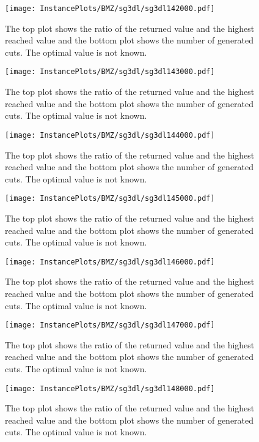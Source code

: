 \documentclass[10pt,a4paper]{article}
\begin{document}
\begin{figure}[H]
\texttt{[image: InstancePlots/BMZ/sg3dl/sg3dl142000.pdf]}
\caption{The top plot shows the ratio of the returned value and the highest reached value     and the bottom plot shows the number of generated cuts. The optimal value is not known.}
\end{figure}

\begin{figure}[H]
\texttt{[image: InstancePlots/BMZ/sg3dl/sg3dl143000.pdf]}
\caption{The top plot shows the ratio of the returned value and the highest reached value     and the bottom plot shows the number of generated cuts. The optimal value is not known.}
\end{figure}

\begin{figure}[H]
\texttt{[image: InstancePlots/BMZ/sg3dl/sg3dl144000.pdf]}
\caption{The top plot shows the ratio of the returned value and the highest reached value     and the bottom plot shows the number of generated cuts. The optimal value is not known.}
\end{figure}

\begin{figure}[H]
\texttt{[image: InstancePlots/BMZ/sg3dl/sg3dl145000.pdf]}
\caption{The top plot shows the ratio of the returned value and the highest reached value     and the bottom plot shows the number of generated cuts. The optimal value is not known.}
\end{figure}

\begin{figure}[H]
\texttt{[image: InstancePlots/BMZ/sg3dl/sg3dl146000.pdf]}
\caption{The top plot shows the ratio of the returned value and the highest reached value     and the bottom plot shows the number of generated cuts. The optimal value is not known.}
\end{figure}

\begin{figure}[H]
\texttt{[image: InstancePlots/BMZ/sg3dl/sg3dl147000.pdf]}
\caption{The top plot shows the ratio of the returned value and the highest reached value     and the bottom plot shows the number of generated cuts. The optimal value is not known.}
\end{figure}

\begin{figure}[H]
\texttt{[image: InstancePlots/BMZ/sg3dl/sg3dl148000.pdf]}
\caption{The top plot shows the ratio of the returned value and the highest reached value     and the bottom plot shows the number of generated cuts. The optimal value is not known.}
\end{figure}
\end{document}
